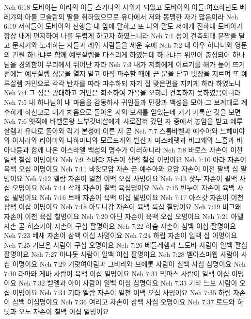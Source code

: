 Neh 6:18  도비야는 아라의 아들 스가냐의 사위가 되었고 도비야의 아들 여호하난도 베레갸의 아들 므술람의 딸을 취하였으므로 유다에서 저와 동맹한 자가 많음이라
Neh 6:19  저희들이 도비야의 선행을 내 앞에 말하고 또 나의 말도 저에게 전하매 도비야가 항상 내게 편지하여 나를 두렵게 하고자 하였느니라
Neh 7:1  성이 건축되매 문짝을 달고 문지기와 노래하는 자들과 레위 사람들을 세운 후에
Neh 7:2  내 아우 하나니와 영문의 관원 하나냐로 함께 예루살렘을 다스리게 하였는데 하나냐는 위인이 충성되어 하나님을 경외함이 무리에서 뛰어난 자라
Neh 7:3  내가 저희에게 이르기를 해가 높이 뜨기 전에는 예루살렘 성문을 열지 말고 아직 파수할 때에 곧 문을 닫고 빗장을 지르며 또 예루살렘 거민으로 각각 반차를 따라 파수하되 자기 집 맞은편을 지키게 하라 하였노니
Neh 7:4  그 성은 광대하고 거민은 희소하여 가옥을 오히려 건축하지 못하였음이니라
Neh 7:5  내 하나님이 내 마음을 감동하사 귀인들과 민장과 백성을 모아 그 보계대로 계수하게 하신고로 내가 처음으로 돌아온 자의 보계를 얻었는데 거기 기록한 것을 보면
Neh 7:6  옛적에 바벨론왕 느부갓네살에게 사로잡혀 갔던 자 중에서 놓임을 받고 예루살렘과 유다로 돌아와 각기 본성에 이른 자 곧
Neh 7:7  스룹바벨과 예수아와 느헤미야와 아사랴와 라아먀와 나하마니와 모르드개와 빌산과 미스베렛과 비그왜와 느훔과 바아나등과 함께 나온 이스라엘 백성의 명수가 이러하니라
Neh 7:8  바로스 자손이 이천 일백 칠십 이명이요
Neh 7:9  스바댜 자손이 삼백 칠십 이명이요
Neh 7:10  아라 자손이 육백 오십 이명이요
Neh 7:11  바핫모압 자손 곧 예수아와 요압 자손이 이천 팔백 십 팔명이요
Neh 7:12  엘람 자손이 일천 이백 오십 사명이요
Neh 7:13  삿두 자손이 팔백 사십 오명이요
Neh 7:14  삭개 자손이 칠백 육십명이요
Neh 7:15  빈누이 자손이 육백 사십 팔명이요
Neh 7:16  브배 자손이 육백 이십 팔명이요
Neh 7:17  아스갓 자손이 이천 삼백 이십 이명이요
Neh 7:18  아도니감 자손이 육백 륙십 칠명이요
Neh 7:19  비그왜 자손이 이천 육십 칠명이요
Neh 7:20  아딘 자손이 육백 오십 오명이요
Neh 7:21  아델 자손 곧 히스기야 자손이 구십 팔명이요
Neh 7:22  하숨 자손이 삼백 이십 팔명이요
Neh 7:23  베새 자손이 삼백 이십 사명이요
Neh 7:24  하립 자손이 일백 십 이명이요
Neh 7:25  기브온 사람이 구십 오명이요
Neh 7:26  베들레헴과 느도바 사람이 일백 팔십 팔명이요
Neh 7:27  아나돗 사람이 일백 이십 팔명이요
Neh 7:28  벧아스마웹 사람이 사십 이명이요
Neh 7:29  기럇여아림과 그비라와 브에롯 사람이 칠백 사십 삼명이요
Neh 7:30  라마와 게바 사람이 육백 이십 일명이요
Neh 7:31  믹마스 사람이 일백 이십 이명이요
Neh 7:32  벧엘과 아이 사람이 일백 이십 삼명이요
Neh 7:33  기타 느보 사람이 오십 이명이요
Neh 7:34  기타 엘람 자손이 일천 이백 오십 사명이요
Neh 7:35  하림 자손이 삼백 이십명이요
Neh 7:36  여리고 자손이 삼백 사십 오명이요
Neh 7:37  로드와 하딧과 오노 자손이 칠백 이십 일명이요
